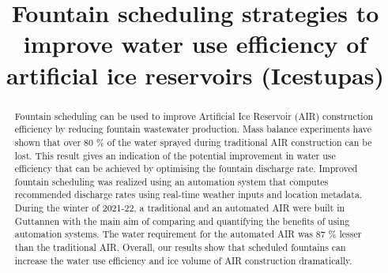 \documentclass[tc, manuscript]{copernicus}
\begin{document}
\title{Fountain scheduling strategies to improve water use efficiency of artificial
ice reservoirs (Icestupas)}

\def\Authors{Suryanarayanan Balasubramanian\,$^{1,2}$, Martin Hoelzle\,$^{1}$Roger Waser\,$^{3}$,Martin Von Burg\,$^{3}$,}
\def\Address{$^{1}$University of Fribourg, Department of Geosciences, Fribourg, Switzerland $^{2}$University of
Applied Sciences and Arts, Luzern, Switzerland} \def\corrAuthor{Suryanarayanan Balasubramanian}





\maketitle

\begin{abstract}

  Fountain scheduling can be used to improve Artificial Ice Reservoir (AIR) construction efficiency by reducing
  fountain wastewater production. Mass balance experiments have shown that over 80 \% of the water sprayed
  during traditional AIR construction can be lost. This result gives an indication of the potential improvement
  in water use efficiency that can be achieved by optimising the fountain discharge rate. Improved fountain
  scheduling was realized using an automation system that computes recommended discharge rates using real-time
  weather inputs and location metadata. During the winter of 2021-22, a traditional and an automated AIR were
  built in Guttannen with the main aim of comparing and quantifying the benefits of using automation systems.
  The water requirement for the automated AIR was 87 \% lesser than the traditional AIR.  Overall, our results
  show that scheduled fountains can increase the water use efficiency and ice volume of AIR construction
  dramatically.

\end{abstract}
\end{document}
